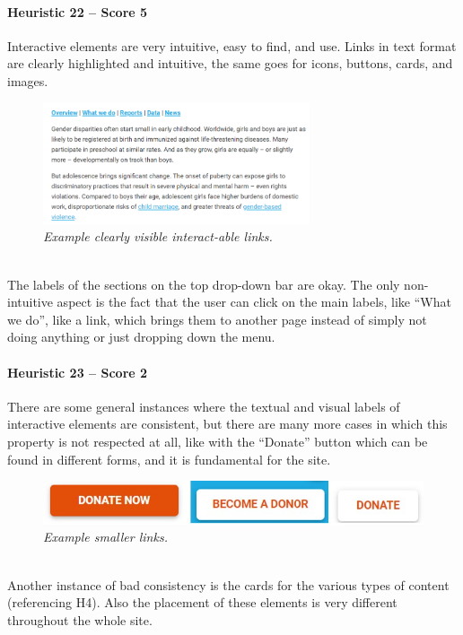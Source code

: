 \paragraph*{Heuristic 22 – Score 5}
Interactive elements are very intuitive, easy to find, and use. Links in text format are clearly highlighted and intuitive, the same goes for icons, buttons, cards, and images.
\begin{figure}[h]
	\centering
	\begin{center}
		\includegraphics[width=0.7\textwidth]{Picture22.png}
	\end{center}
	\captionsetup{font=small}
	\caption{\textit{Example clearly visible interact-able links.}}
	\label{fig:label22}
\end{figure}
\\
The labels of the sections on the top drop-down bar are okay. The only non-intuitive aspect is the fact that the user can click on the main labels, like “What we do”, like a link, which brings them to another page instead of simply not doing anything or just dropping down the menu.

\paragraph*{Heuristic 23 – Score 2}
There are some general instances where the textual and visual labels of interactive elements are consistent, but there are many more cases in which this property is not respected at all, like with the “Donate” button which can be found in different forms, and it is fundamental for the site.
\begin{figure}[h]
	\includegraphics[width=\textwidth]{Picture23.jpg}
	\captionsetup{font=small}
	\caption{\textit{Example smaller links.}}
	\label{fig:label23}
\end{figure}
\\
Another instance of bad consistency is the cards for the various types of content (referencing H4). Also the placement of these elements is very different throughout the whole site.

